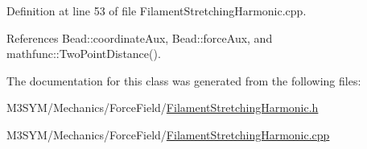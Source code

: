 Definition at line 53 of file Filament\+Stretching\+Harmonic.\+cpp.



References Bead\+::coordinate\+Aux, Bead\+::force\+Aux, and mathfunc\+::\+Two\+Point\+Distance().



The documentation for this class was generated from the following files\+:\begin{DoxyCompactItemize}
\item 
M3\+S\+Y\+M/\+Mechanics/\+Force\+Field/\hyperlink{FilamentStretchingHarmonic_8h}{Filament\+Stretching\+Harmonic.\+h}\item 
M3\+S\+Y\+M/\+Mechanics/\+Force\+Field/\hyperlink{FilamentStretchingHarmonic_8cpp}{Filament\+Stretching\+Harmonic.\+cpp}\end{DoxyCompactItemize}
